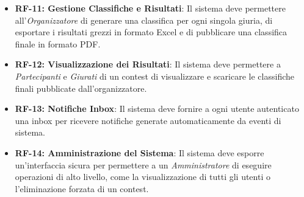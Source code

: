\begin{itemize}
    \item \textbf{RF-11: Gestione Classifiche e Risultati}: Il sistema deve permettere all'\emph{Organizzatore} di generare una classifica per ogni singola giuria, di esportare i risultati grezzi in formato Excel e di pubblicare una classifica finale in formato PDF\@.
    \item \textbf{RF-12: Visualizzazione dei Risultati}: Il sistema deve permettere a \emph{Partecipanti} e \emph{Giurati} di un contest di visualizzare e scaricare le classifiche finali pubblicate dall'organizzatore.
    \item \textbf{RF-13: Notifiche Inbox}: Il sistema deve fornire a ogni utente autenticato una inbox per ricevere notifiche generate automaticamente da eventi di sistema.
    \item \textbf{RF-14: Amministrazione del Sistema}: Il sistema deve esporre un'interfaccia sicura per permettere a un \emph{Amministratore} di eseguire operazioni di alto livello, come la visualizzazione di tutti gli utenti o l'eliminazione forzata di un contest.
\end{itemize}

